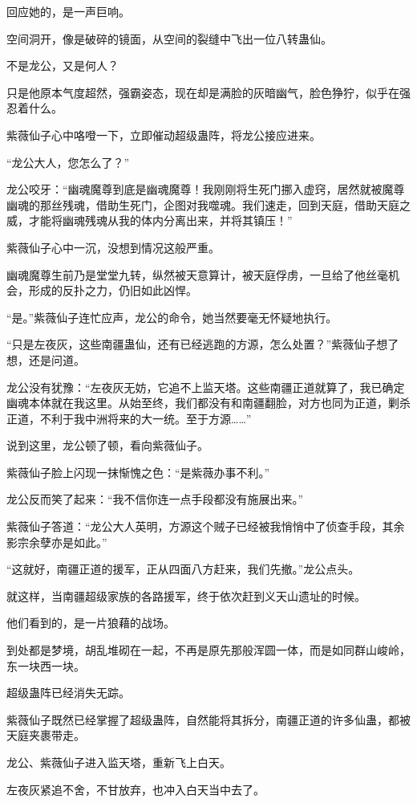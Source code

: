 \begin{this_body}
回应她的，是一声巨响。

空间洞开，像是破碎的镜面，从空间的裂缝中飞出一位八转蛊仙。

不是龙公，又是何人？

只是他原本气度超然，强霸姿态，现在却是满脸的灰暗幽气，脸色狰狞，似乎在强忍着什么。

紫薇仙子心中咯噔一下，立即催动超级蛊阵，将龙公接应进来。

“龙公大人，您怎么了？”

龙公咬牙：“幽魂魔尊到底是幽魂魔尊！我刚刚将生死门挪入虚窍，居然就被魔尊幽魂的那丝残魂，借助生死门，企图对我噬魂。我们速走，回到天庭，借助天庭之威，才能将幽魂残魂从我的体内分离出来，并将其镇压！”

紫薇仙子心中一沉，没想到情况这般严重。

幽魂魔尊生前乃是堂堂九转，纵然被天意算计，被天庭俘虏，一旦给了他丝毫机会，形成的反扑之力，仍旧如此凶悍。

“是。”紫薇仙子连忙应声，龙公的命令，她当然要毫无怀疑地执行。

“只是左夜灰，这些南疆蛊仙，还有已经逃跑的方源，怎么处置？”紫薇仙子想了想，还是问道。

龙公没有犹豫：“左夜灰无妨，它追不上监天塔。这些南疆正道就算了，我已确定幽魂本体就在我这里。从始至终，我们都没有和南疆翻脸，对方也同为正道，剿杀正道，不利于我中洲将来的大一统。至于方源……”

说到这里，龙公顿了顿，看向紫薇仙子。

紫薇仙子脸上闪现一抹惭愧之色：“是紫薇办事不利。”

龙公反而笑了起来：“我不信你连一点手段都没有施展出来。”

紫薇仙子答道：“龙公大人英明，方源这个贼子已经被我悄悄中了侦查手段，其余影宗余孽亦是如此。”

“这就好，南疆正道的援军，正从四面八方赶来，我们先撤。”龙公点头。

就这样，当南疆超级家族的各路援军，终于依次赶到义天山遗址的时候。

他们看到的，是一片狼藉的战场。

到处都是梦境，胡乱堆砌在一起，不再是原先那般浑圆一体，而是如同群山峻岭，东一块西一块。

超级蛊阵已经消失无踪。

紫薇仙子既然已经掌握了超级蛊阵，自然能将其拆分，南疆正道的许多仙蛊，都被天庭夹裹带走。

龙公、紫薇仙子进入监天塔，重新飞上白天。

左夜灰紧追不舍，不甘放弃，也冲入白天当中去了。


\end{this_body}
